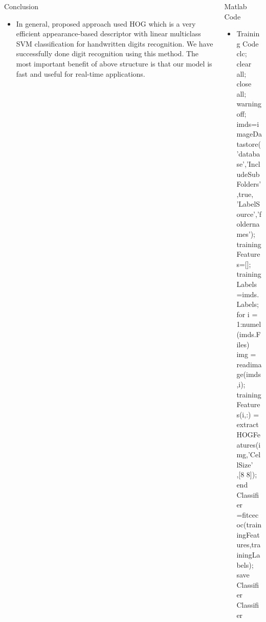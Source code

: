 \documentclass[8pt,final,hyperref={pdfpagelabels=false}]{beamer}
\theoremstyle{plain}
\begin{document}
\begin{frame}
\begin{columns}[t]
\begin{column}{.23\textwidth}
    \begin{block}{Conclusion}
        
        \begin{itemize}
            \item In general, proposed approach used HOG which is a very efficient appearance-based descriptor with linear multiclass SVM classification for handwritten digits recognition. We have successfully done digit recognition using this method. The most important benefit of above structure is that our model is fast and useful for real-time applications.
            
        \end{itemize}
    \end{block}
\end{column} %

\begin{column}{.23\textwidth} %
    \begin{block}{Matlab Code}
    
     \begin{itemize}
            \item Training Code\\
            \vspace{\baselineskip}
            clc;\\
    clear all;\\
    close all;\\
    warning off;\\
    imds=imageDatastore('database','IncludeSubFolders',true,\\'LabelSource','foldernames');\\
    trainingFeatures=[];\\
    trainingLabels=imds.Labels;  \\     
    for i = 1:numel(imds.Files)\\         %
        img = readimage(imds,i);\\
        trainingFeatures(i,:) = extractHOGFeatures(img,'CellSize'\\,[8 8]);\\
    end\\
    Classifier =fitcecoc(trainingFeatures,trainingLabels);\\
    save Classifier Classifier\\
    \vspace{\baselineskip}


\end{itemize}
\end{block}
\end{column}
\end{columns}
\end{frame}
\end{document}
